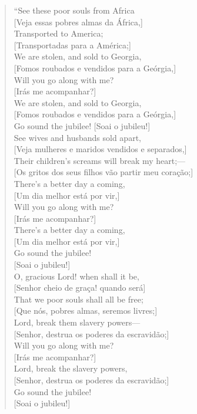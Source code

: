 \begin{verse}
``See these poor souls from Africa\\
{[}Veja essas pobres almas da África,{]}\\
Transported to America;\\
{[}Transportadas para a América;{]}\\
We are stolen, and sold to Georgia,\\
{[}Fomos roubados e vendidos para a Geórgia,{]}\\
Will you go along with me?\\
{[}Irás me acompanhar?{]}\\
We are stolen, and sold to Georgia,\\
{[}Fomos roubados e vendidos para a Geórgia,{]}\\
Go sound the jubilee! {[}Soai o jubileu!{]}\\[5pt]

See wives and husbands sold apart,\\
{[}Veja mulheres e maridos vendidos e separados,{]}\\
Their children's screams will break my heart;---\\
{[}Os gritos dos seus filhos vão partir meu coração;{]}\\
There's a better day a coming,\\
{[}Um dia melhor está por vir,{]}\\
Will you go along with me?\\
{[}Irás me acompanhar?{]}\\
There's a better day a coming,\\
{[}Um dia melhor está por vir,{]}\\
Go sound the jubilee!\\
{[}Soai o jubileu!{]}\\[5pt]

O, gracious Lord! when shall it be,\\
{[}Senhor cheio de graça! quando será{]}\\
That we poor souls shall all be free;\\
{[}Que nós, pobres almas, seremos livres;{]}\\
Lord, break them slavery powers---\\
{[}Senhor, destrua os poderes da escravidão;{]}\\
Will you go along with me?\\
{[}Irás me acompanhar?{]}\\
Lord, break the slavery powers,\\
{[}Senhor, destrua os poderes da escravidão;{]}\\
Go sound the jubilee!\\
{[}Soai o jubileu!{]}\\[5pt]


\end{verse}
